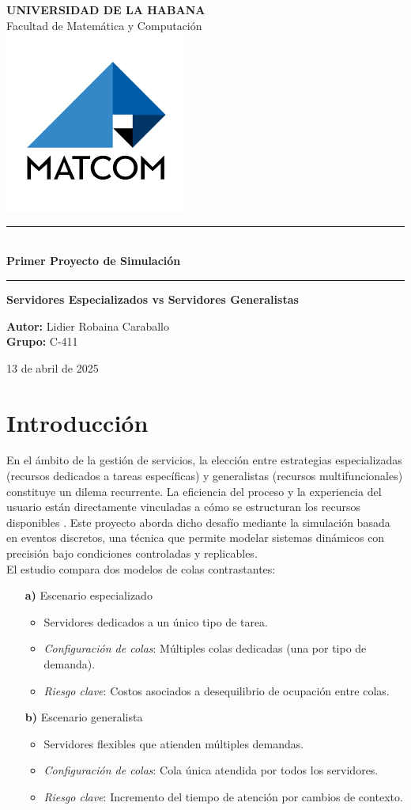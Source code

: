\documentclass[letterpaper, 12pt]{report}
\newcommand*{\customtitlepage}{
    \begin{titlepage}
        \begin{center}
            \vspace*{1cm}
            
            
            {\LARGE \textbf{UNIVERSIDAD DE LA HABANA}}\\
            \vspace{0.5cm}
            {\Large Facultad de Matem\'atica y Computaci\'on}\\
            

            \includegraphics[scale=0.5]{images/logo.png}
            
            \vspace{1cm}
            
            
            \rule{\textwidth}{1.5pt}\\
            \vspace{0.5cm}
            {\LARGE \textcolor{primary}{\textbf{Primer Proyecto de Simulación}}}
            \vspace{0.5cm}
            \rule{\textwidth}{1.5pt}
            
            \vspace{2cm}
            
            {\Large \textbf{Servidores Especializados vs Servidores Generalistas}}\\
            \vspace{1cm}
            
            {\Large \textbf{Autor:} Lidier Robaina Caraballo \\
            \vspace{0.5cm}
            {\Large \textbf{Grupo:} C-411 }\\
            \vspace{1.5cm}
            
            {\Large 13 de abril de 2025
            }
            }
        \end{center}
    \end{titlepage}
}
\begin{document}
\customtitlepage

\tableofcontents
\thispagestyle{empty}
\cleardoublepage

\setcounter{page}{1}

\chapter{Introducción}



En el ámbito de la gestión de servicios, la elección entre estrategias especializadas (recursos dedicados a tareas específicas) y generalistas (recursos multifuncionales) constituye un dilema recurrente. La eficiencia del proceso y la experiencia del usuario están directamente vinculadas a cómo se estructuran los recursos disponibles \cite{pinker2000} . Este proyecto aborda dicho desafío mediante la simulación basada en eventos discretos, una técnica que permite modelar sistemas dinámicos con precisión bajo condiciones controladas y replicables. \\



El estudio compara dos modelos de colas contrastantes:

\begin{enumerate}
    \item[\textbf{a)}] Escenario especializado   \begin{itemize}[noitemsep]
        \item Servidores dedicados a un único tipo de tarea.
        \item \textit{Configuración de colas}: Múltiples colas dedicadas (una por tipo de demanda).
        \item \textit{Riesgo clave}: Costos asociados a desequilibrio de ocupación entre colas.
    \end{itemize}
    
    \item[\textbf{b)}] Escenario generalista
    \begin{itemize}[noitemsep]
        \item Servidores flexibles que atienden múltiples demandas.
        \item \textit{Configuración de colas}: Cola única atendida por todos los servidores.
        \item \textit{Riesgo clave}: Incremento del tiempo de atención por cambios de contexto.
    \end{itemize}
\end{enumerate}
\end{document}

